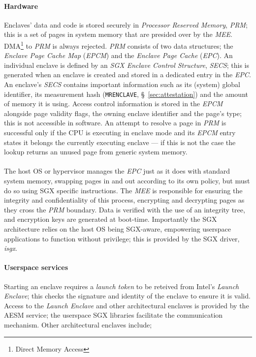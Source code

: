 \paragraph{Hardware} Enclaves' data and code is stored securely in \textit{Processor Reserved Memory}, \textit{PRM}; this is a set of pages in system memory that are presided over by the \textit{MEE}. DMA\footnote{Direct Memory Access} to \textit{PRM} is always rejected. \textit{PRM} consists of two data structures; the \textit{Enclave Page Cache Map} (\textit{EPCM}) and the \textit{Enclave Page Cache} (\textit{EPC}). An individual enclave is defined by an \textit{SGX Enclave Control Structure}, \textit{SECS}; this is generated when an enclave is created and stored in a dedicated entry in the \textit{EPC}. An enclave's \textit{SECS} contains important information such as its (system) global identifier, its measurement hash (\texttt{MRENCLAVE}, §~\ref{sec:attestation}) and the amount of memory it is using. Access control information is stored in the \textit{EPCM} alongside page validity flags, the owning enclave identifier and the page's type; this is not accessible in software. An attempt to resolve a page in \textit{PRM} is successful only if the CPU is executing in enclave mode and its \textit{EPCM} entry states it belongs the currently executing enclave --- if this is not the case the lookup returns an unused page from generic system memory.

\paragraph{} The host OS or hypervisor manages the \textit{EPC} just as it does with standard system memory, swapping pages in and out according to its own policy, but must do so using SGX specific instructions. The \textit{MEE} is responsible for ensuring the integrity and confidentiality of this process, encrypting and decrypting pages as they cross the \textit{PRM} boundary. Data is verified with the use of an integrity tree, and encryption keys are generated at boot-time. Importantly the SGX architecture relies on the host OS being SGX-aware, empowering userspace applications to function without privilege; this is provided by the SGX driver, \textit{isgx}.

\paragraph{Userspace services} Starting an enclave requires a \textit{launch token} to be reteived from Intel's \textit{Launch Enclave}; this checks the signature and identity of the enclave to ensure it is valid. Access to the \textit{Launch Enclave} and other architectural enclaves is provided by the AESM service; the userspace SGX libraries facilitate the communication mechanism. Other architectural enclaves include;


